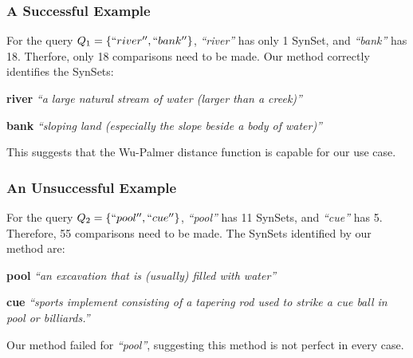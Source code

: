 \subsubsection{A Successful Example}
For the query $Q_1 = \{``river '', ``bank''\}$, \textit{``river''} has only 1 SynSet, and \textit{``bank''} has 18. Therfore, only 18 comparisons need to be made. Our method correctly identifies the SynSets:

\vspace{5pt}

\noindent
\textbf{river} \textit{``a large natural stream of water (larger than a creek)''} 

\vspace{5pt}

\noindent
\textbf{bank} \textit{``sloping land (especially the slope beside a body of water)''}

\vspace{5pt}

\noindent
This suggests that the Wu-Palmer distance function is capable for our use case.




\subsubsection{An Unsuccessful Example}

\noindent For the query $Q_2 = \{``pool '', ``cue''\}$, \textit{``pool''} has 11 SynSets, and \textit{``cue''} has 5. Therefore, 55 comparisons need to be made. The SynSets identified by our method are:

\vspace{5pt}

\noindent
\textbf{pool} \textit{``an excavation that is (usually) filled with water''}

\vspace{5pt}

\noindent
\textbf{cue} \textit{``sports implement consisting of a tapering rod used to strike a cue ball in pool or billiards.''}

\vspace{5pt}

\noindent
Our method failed for \textit{``pool''}, suggesting this method is not perfect in every case.

